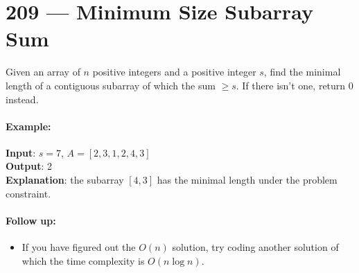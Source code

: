 \section{209 --- Minimum Size Subarray Sum}
Given an array of $n$ positive integers and a positive integer $s$, find the minimal length of a contiguous subarray of which the sum $\geq s$. If there isn't one, return 0 instead.
\paragraph{Example:}
\begin{flushleft}
\textbf{Input}: $s = 7$, $A = [2,3,1,2,4,3]$
\\
\textbf{Output}: 2
\\
\textbf{Explanation}: the subarray $[4,3]$ has the minimal length under the problem constraint.
\end{flushleft}
\paragraph{Follow up:}
\begin{itemize}
\item If you have figured out the $O(n)$ solution, try coding another solution of which the time complexity is $O(n \log n)$.
\end{itemize} 
